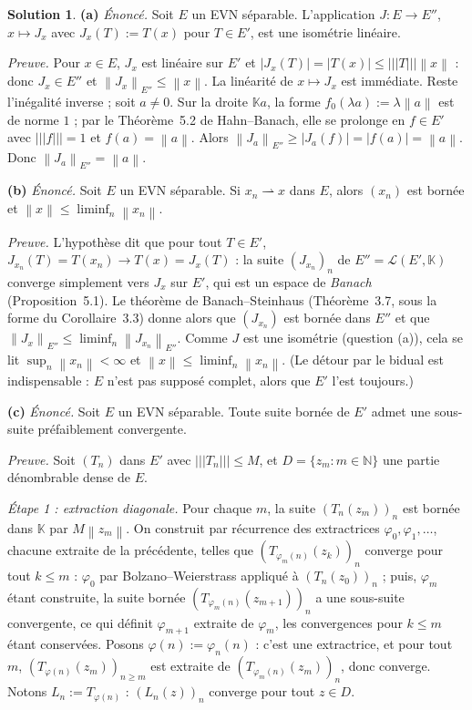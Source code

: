 \documentclass[11pt,a4paper]{article}
\newcommand{\N}{\mathbb{N}}
\newcommand{\K}{\mathbb{K}}
\newcommand{\norm}[1]{\left\|#1\right\|}
\newcommand{\opnorm}[1]{|\!|\!|#1|\!|\!|}
\newcommand{\Lc}{\mathcal{L}}
\newcommand{\wk}{\rightharpoonup}
\theoremstyle{definition}
\newtheorem*{solution}{Solution}
\begin{document}
\begin{solution}
\noindent\textbf{(a)} \emph{Énoncé.} Soit $E$ un EVN séparable. L'application $J:E\to E''$, $x\mapsto J_x$ avec $J_x(T):=T(x)$ pour $T\in E'$, est une isométrie linéaire.

\emph{Preuve.} Pour $x\in E$, $J_x$ est linéaire sur $E'$ et $|J_x(T)|=|T(x)|\le\opnorm T\norm x$ : donc $J_x\in E''$ et $\norm{J_x}_{E''}\le\norm x$. La linéarité de $x\mapsto J_x$ est immédiate. Reste l'inégalité inverse ; soit $a\ne0$. Sur la droite $\K a$, la forme $f_0(\lambda a):=\lambda\norm a$ est de norme $1$ ; par le Théorème~5.2 de Hahn--Banach, elle se prolonge en $f\in E'$ avec $\opnorm f=1$ et $f(a)=\norm a$. Alors $\norm{J_a}_{E''}\ge|J_a(f)|=|f(a)|=\norm a$. Donc $\norm{J_a}_{E''}=\norm a$.

\medskip
\noindent\textbf{(b)} \emph{Énoncé.} Soit $E$ un EVN séparable. Si $x_n\wk x$ dans $E$, alors $(x_n)$ est bornée et $\norm x\le\liminf_n\norm{x_n}$.

\emph{Preuve.} L'hypothèse dit que pour tout $T\in E'$, $J_{x_n}(T)=T(x_n)\to T(x)=J_x(T)$ : la suite $(J_{x_n})_n$ de $E''=\Lc(E',\K)$ converge simplement vers $J_x$ sur $E'$, qui est un espace de \emph{Banach} (Proposition~5.1). Le théorème de Banach--Steinhaus (Théorème~3.7, sous la forme du Corollaire~3.3) donne alors que $(J_{x_n})$ est bornée dans $E''$ et que $\norm{J_x}_{E''}\le\liminf_n\norm{J_{x_n}}_{E''}$. Comme $J$ est une isométrie (question (a)), cela se lit $\sup_n\norm{x_n}<\infty$ et $\norm x\le\liminf_n\norm{x_n}$. (Le détour par le bidual est indispensable : $E$ n'est pas supposé complet, alors que $E'$ l'est toujours.)

\medskip
\noindent\textbf{(c)} \emph{Énoncé.} Soit $E$ un EVN séparable. Toute suite bornée de $E'$ admet une sous-suite préfaiblement convergente.

\emph{Preuve.} Soit $(T_n)$ dans $E'$ avec $\opnorm{T_n}\le M$, et $D=\{z_m:m\in\N\}$ une partie dénombrable dense de $E$.

\emph{Étape 1 : extraction diagonale.} Pour chaque $m$, la suite $(T_n(z_m))_n$ est bornée dans $\K$ par $M\norm{z_m}$. On construit par récurrence des extractrices $\varphi_0,\varphi_1,\dots$, chacune extraite de la précédente, telles que $(T_{\varphi_m(n)}(z_k))_n$ converge pour tout $k\le m$ : $\varphi_0$ par Bolzano--Weierstrass appliqué à $(T_n(z_0))_n$ ; puis, $\varphi_m$ étant construite, la suite bornée $(T_{\varphi_m(n)}(z_{m+1}))_n$ a une sous-suite convergente, ce qui définit $\varphi_{m+1}$ extraite de $\varphi_m$, les convergences pour $k\le m$ étant conservées. Posons $\varphi(n):=\varphi_n(n)$ : c'est une extractrice, et pour tout $m$, $(T_{\varphi(n)}(z_m))_{n\ge m}$ est extraite de $(T_{\varphi_m(n)}(z_m))_n$, donc converge. Notons $L_n:=T_{\varphi(n)}$ : $(L_n(z))_n$ converge pour tout $z\in D$.


\end{solution}
\end{document}
